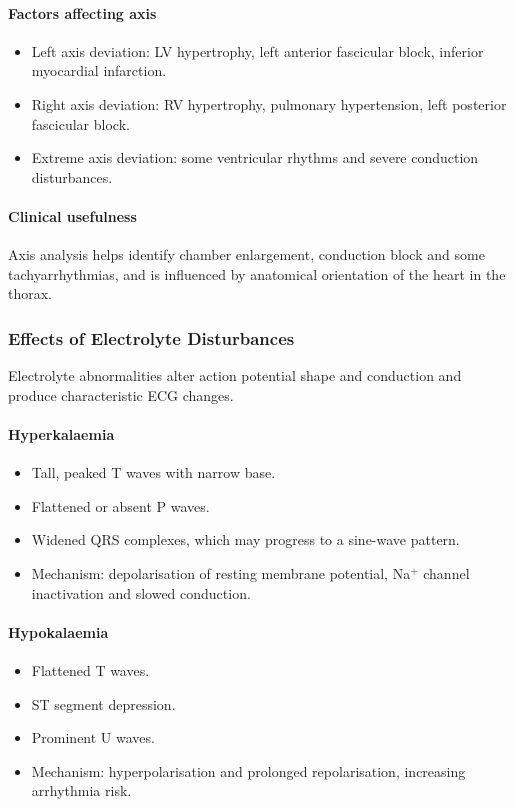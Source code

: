 \documentclass[11pt,a4paper]{article}
\begin{document}
\paragraph{Factors affecting axis}
\begin{itemize}
  \item Left axis deviation: LV hypertrophy, left anterior fascicular block, inferior myocardial infarction.
  \item Right axis deviation: RV hypertrophy, pulmonary hypertension, left posterior fascicular block.
  \item Extreme axis deviation: some ventricular rhythms and severe conduction disturbances.
\end{itemize}

\paragraph{Clinical usefulness}
Axis analysis helps identify chamber enlargement, conduction block and some tachyarrhythmias, and is influenced by anatomical orientation of the heart in the thorax.

\subsubsection{Effects of Electrolyte Disturbances}

Electrolyte abnormalities alter action potential shape and conduction and produce characteristic ECG changes.

\paragraph{Hyperkalaemia}
\begin{itemize}
  \item Tall, peaked T waves with narrow base.
  \item Flattened or absent P waves.
  \item Widened QRS complexes, which may progress to a sine-wave pattern.
  \item Mechanism: depolarisation of resting membrane potential, Na$^+$ channel inactivation and slowed conduction.
\end{itemize}

\paragraph{Hypokalaemia}
\begin{itemize}
  \item Flattened T waves.
  \item ST segment depression.
  \item Prominent U waves.
  \item Mechanism: hyperpolarisation and prolonged repolarisation, increasing arrhythmia risk.
\end{itemize}
\end{document}

